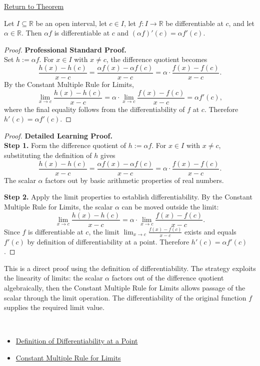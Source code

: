 \newpage
{}
\label{prf:constant-multiple}

\begin{remark*}[Return]
\hyperref[thm:constant-multiple-rule]{Return to Theorem}
\end{remark*}

\begin{theorem*}
Let $I \subseteq \mathbb{R}$ be an open interval, let $c \in I$, let $f : I \to \mathbb{R}$ be differentiable at $c$, and let $\alpha \in \mathbb{R}$. Then $\alpha f$ is differentiable at $c$ and $(\alpha f)'(c) = \alpha f'(c)$.
\end{theorem*}

\begin{proof}
\textbf{Professional Standard Proof.}~\\
Set $h := \alpha f$. For $x \in I$ with $x \neq c$, the difference quotient becomes
\[
  \frac{h(x) - h(c)}{x - c} = \frac{\alpha f(x) - \alpha f(c)}{x - c} = \alpha \cdot \frac{f(x) - f(c)}{x - c}.
\]
By the Constant Multiple Rule for Limits,
\[
  \lim_{x \to c} \frac{h(x) - h(c)}{x - c} = \alpha \cdot \lim_{x \to c} \frac{f(x) - f(c)}{x - c} = \alpha f'(c),
\]
where the final equality follows from the differentiability of $f$ at $c$. Therefore $h'(c) = \alpha f'(c)$.
\end{proof}

\begin{proof}
\textbf{Detailed Learning Proof.}~\\

\textbf{Step 1.} Form the difference quotient of $h := \alpha f$. For $x \in I$ with $x \neq c$, substituting the definition of $h$ gives
\[
  \frac{h(x) - h(c)}{x - c} = \frac{\alpha f(x) - \alpha f(c)}{x - c} = \alpha \cdot \frac{f(x) - f(c)}{x - c}.
\]
The scalar $\alpha$ factors out by basic arithmetic properties of real numbers.

\textbf{Step 2.} Apply the limit properties to establish differentiability. By the Constant Multiple Rule for Limits, the scalar $\alpha$ can be moved outside the limit:
\[
  \lim_{x \to c} \frac{h(x) - h(c)}{x - c} = \alpha \cdot \lim_{x \to c} \frac{f(x) - f(c)}{x - c}.
\]
Since $f$ is differentiable at $c$, the limit $\lim_{x \to c} \frac{f(x) - f(c)}{x - c}$ exists and equals $f'(c)$ by definition of differentiability at a point. Therefore $h'(c) = \alpha f'(c)$.
\end{proof}

\begin{remark*}
This is a direct proof using the definition of differentiability. The strategy exploits the linearity of limits: the scalar $\alpha$ factors out of the difference quotient algebraically, then the Constant Multiple Rule for Limits allows passage of the scalar through the limit operation. The differentiability of the original function $f$ supplies the required limit value.
\end{remark*}

\begin{remark*}[Dependencies]~\\
\begin{itemize}
  \item \hyperref[def:derivative-at-point]{Definition of Differentiability at a Point}
  \item \hyperref[thm:limit-constant-multiple]{Constant Multiple Rule for Limits}
\end{itemize}
\end{remark*}